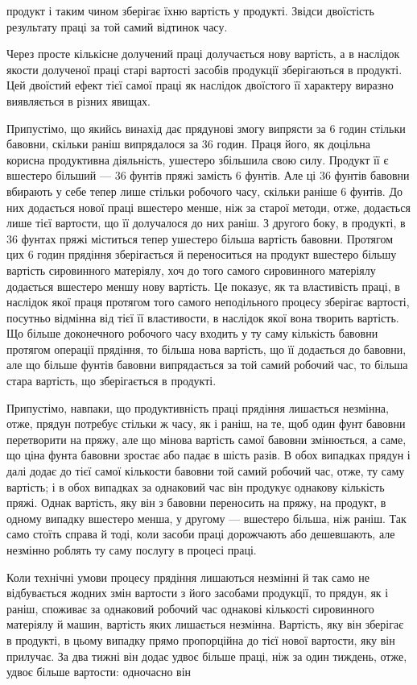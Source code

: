\parcont{}  %
продукт і таким чином зберігає їхню вартість у продукті. Звідси
двоїстість результату праці за той самий відтинок часу.

Через просте кількісне долучений праці долучається нову
вартість, а в наслідок якости долученої праці старі вартості засобів
продукції зберігаються в продукті. Цей двоїстий ефект тієї
самої праці як наслідок двоїстого її характеру виразно виявляється
в різних явищах.

Припустімо, що якийсь винахід дає прядунові змогу випрясти
за 6 годин стільки бавовни, скільки раніш випрядалося за 36 годин.
Праця його, як доцільна корисна продуктивна діяльність,
ушестеро збільшила свою силу. Продукт її є вшестеро більший —
36 фунтів пряжі замість 6 фунтів. Але ці 36 фунтів бавовни вбирають
у себе тепер лише стільки робочого часу, скільки раніше
6 фунтів. До них додається нової праці вшестеро менше, ніж за
старої методи, отже, додається лише  тієї вартости, що її долучалося
до них раніш. З другого боку, в продукті, в 36 фунтах
пряжі міститься тепер ушестеро більша вартість бавовни. Протягом
цих 6 годин прядіння зберігається й переноситься на продукт
вшестеро більшу вартість сировинного матеріялу, хоч до
того самого сировинного матеріялу додається вшестеро меншу
нову вартість. Це показує, як та властивість праці, в наслідок
якої праця протягом того самого неподільного процесу зберігає
вартості, посутньо відмінна від тієї її властивости, в наслідок
якої вона творить вартість. Що більше доконечного робочого
часу входить у ту саму кількість бавовни протягом операції
прядіння, то більша нова вартість, що її додається до бавовни,
але що більше фунтів бавовни випрядається за той самий робочий
час, то більша стара вартість, що зберігається в продукті.

Припустімо, навпаки, що продуктивність праці прядіння лишається
незмінна, отже, прядун потребує стільки ж часу, як і раніш,
на те, щоб один фунт бавовни перетворити на пряжу, але що
мінова вартість самої бавовни змінюється, а саме, що ціна фунта
бавовни зростає або падає в шість разів. В обох випадках прядун
і далі додає до тієї самої кількости бавовни той самий робочий
час, отже, ту саму вартість; і в обох випадках за однаковий час
він продукує однакову кількість пряжі. Однак вартість, яку він
з бавовни переносить на пряжу, на продукт, в одному випадку
вшестеро менша, у другому — вшестеро більша, ніж раніш. Так
само стоїть справа й тоді, коли засоби праці дорожчають або
дешевшають, але незмінно роблять ту саму послугу в процесі
праці.

Коли технічні умови процесу прядіння лишаються незмінні
й так само не відбувається жодних змін вартости з його засобами
продукції, то прядун, як і раніш, споживає за однаковий робочий
час однакові кількості сировинного матеріялу й машин, вартість
яких лишається незмінна. Вартість, яку він зберігає в продукті,
в цьому випадку прямо пропорційна до тієї нової вартости, яку
він прилучає. За два тижні він додає удвоє більше праці, ніж
за один тиждень, отже, удвоє більше вартости: одночасно він
\parbreak{}  %
